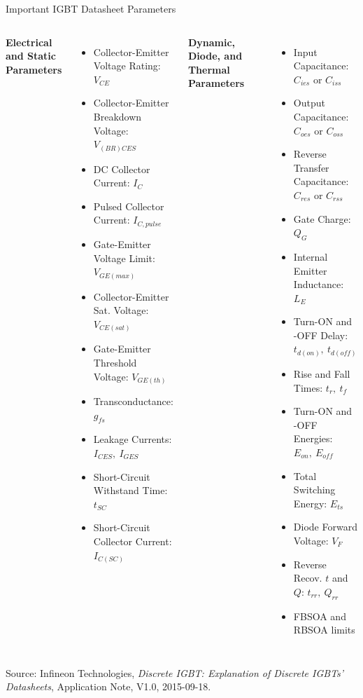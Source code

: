 \begin{frame}{Important IGBT Datasheet Parameters}
\begin{columns}[T]
\textbf{Electrical and Static Parameters}
\begin{itemize}
    \item Collector-Emitter Voltage Rating: $V_{CE}$
    \item Collector-Emitter Breakdown Voltage: $V_{(BR)CES}$
    \item DC Collector Current: $I_C$
    \item Pulsed Collector Current: $I_{C,pulse}$
    \item Gate-Emitter Voltage Limit: $V_{GE(max)}$
    \item Collector-Emitter Sat. Voltage: $V_{CE(sat)}$
    \item Gate-Emitter Threshold Voltage: $V_{GE(th)}$
    \item Transconductance: $g_{fs}$
    \item Leakage Currents: $I_{CES},\ I_{GES}$
    \item Short-Circuit Withstand Time: $t_{SC}$
    \item Short-Circuit Collector Current: $I_{C(SC)}$
\end{itemize}

\textbf{Dynamic, Diode, and Thermal Parameters}
\begin{itemize}
    \item Input Capacitance: $C_{ies}$ or $C_{iss}$
    \item Output Capacitance: $C_{oes}$ or $C_{oss}$
    \item Reverse Transfer Capacitance: $C_{res}$ or $C_{rss}$
    \item Gate Charge: $Q_G$
    \item Internal Emitter Inductance: $L_E$
    \item Turn-ON and -OFF Delay: $t_{d(on)},\ t_{d(off)}$
    \item Rise and Fall Times: $t_r,\ t_f$
    \item Turn-ON and -OFF Energies: $E_{on},\ E_{off}$
    \item Total Switching Energy: $E_{ts}$
    \item Diode Forward Voltage: $V_F$
    \item Reverse Recov. $t$ and $Q$: $t_{rr},\ Q_{rr}$
    \item FBSOA and RBSOA limits
\end{itemize}
\end{columns}

\vspace{0.15cm}
\small
Source: Infineon Technologies, \textit{Discrete IGBT: Explanation of Discrete IGBTs' Datasheets}, Application Note, V1.0, 2015-09-18.
\end{frame}




